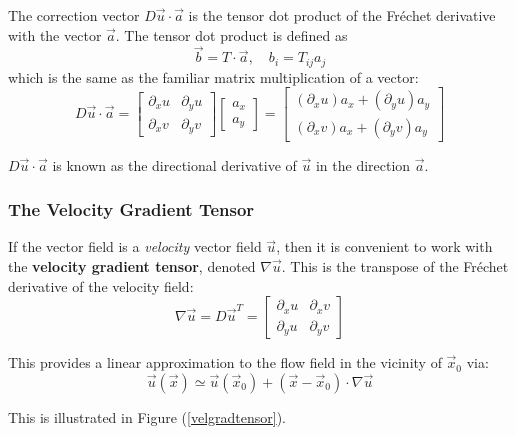 \documentclass[12pt, a4paper, twoside, openright]{book}
\begin{document}
The correction vector $ D\vec{u} \cdot \vec{a}$ is the tensor dot product of the Fr\'{e}chet derivative with the vector $\vec{a}$. The tensor dot product is defined as
\begin{equation}
\vec{b} = T \cdot \vec{a} ,\quad b_i = T_{ij} a_j
\end{equation}
which is the same as the familiar matrix multiplication of a vector:
\begin{equation}
D \vec{u} \cdot \vec{a} =
\begin{bmatrix}
\partial_x u & \partial_y u \\
\partial_x v & \partial_y v
\end{bmatrix}
\begin{bmatrix}
a_x \\ a_y
\end{bmatrix}
=
\begin{bmatrix}
(\partial_x u) a_x + (\partial_y u) a_y \\
(\partial_x v) a_x + (\partial_y v) a_y
\end{bmatrix}
\end{equation}

$ D\vec{u} \cdot \vec{a}$ is known as the directional derivative of $\vec{u}$ in the direction $\vec{a}$.

\subsubsection{The Velocity Gradient Tensor}
If the vector field is a \emph{velocity} vector field $\vec{u}$, then it is convenient to work with the \textbf{velocity gradient tensor}, denoted $\nabla \vec{u}$.  This is the transpose of the Fr\'{e}chet derivative of the velocity field:
\begin{equation}
\nabla \vec{u} = D\vec{u}^T = 
\begin{bmatrix}
\partial_x u & \partial_x v \\
\partial_y u & \partial_y v
\end{bmatrix}
\end{equation}

This provides a linear approximation to the flow field in the vicinity of $\vec{x}_0$ via:
\begin{equation}
\vec{u}(\vec{x}) \simeq \vec{u}(\vec{x}_0) + (\vec{x} - \vec{x}_0)\cdot \nabla \vec{u}
\end{equation}

This is illustrated in Figure (\ref{velgradtensor}).
\end{document}
